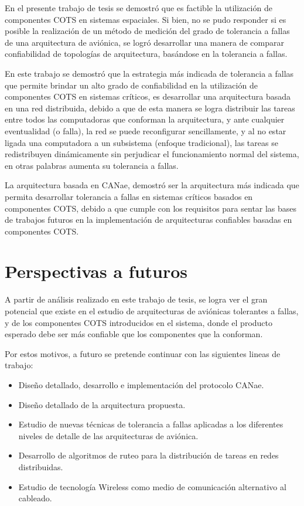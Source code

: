 En el presente trabajo de tesis se demostró que es factible la utilización de
componentes COTS en sistemas espaciales. Si bien, no se pudo responder si es
posible la realización de un método de medición del grado de tolerancia a
fallas de una arquitectura de aviónica, se logró desarrollar una manera
de comparar confiabilidad de topologías de arquitectura, basándose en la
tolerancia a fallas.

En este trabajo se demostró que la estrategia más indicada de tolerancia a
fallas que permite brindar un alto grado de confiabilidad en la utilización de
componentes COTS en sistemas críticos, es desarrollar una arquitectura basada en
una red distribuida, debido a que de esta manera se logra distribuir las tareas
entre todos las computadoras que conforman la arquitectura,
y ante cualquier eventualidad (o falla), la red se puede reconfigurar sencillamente,
y al no estar ligada una computadora a un subsistema (enfoque tradicional), las tareas
se redistribuyen dinámicamente sin perjudicar el funcionamiento normal
del sistema, en otras palabras aumenta su tolerancia a fallas.

La arquitectura basada en CANae, demostró ser la arquitectura más indicada que permita
desarrollar tolerancia a fallas en sistemas críticos basados en componentes COTS,
debido a que cumple con los requisitos para sentar las bases de trabajos futuros
en la implementación de arquitecturas confiables basadas en componentes COTS. 

\section{Perspectivas a futuros}\label{chap:TrabajosFuturos}
A partir de análisis realizado en este trabajo de tesis, se logra ver el gran
potencial que existe en el estudio de arquitecturas de aviónicas tolerantes
a fallas, y de los componentes COTS introducidos en el sistema,
donde el producto esperado debe ser más confiable que los componentes
que la conforman.

Por estos motivos, a futuro se pretende continuar con las siguientes lineas de trabajo:
\begin{itemize}
\item Diseño detallado, desarrollo e implementación del protocolo CANae.
\item Diseño detallado de la arquitectura propuesta.
\item Estudio de nuevas técnicas de tolerancia a fallas aplicadas a los diferentes niveles
de detalle de las arquitecturas de aviónica.
\item Desarrollo de algoritmos de ruteo para la distribución de tareas en redes distribuidas.
\item Estudio de tecnología Wireless como medio de comunicación alternativo al cableado.
\end{itemize}

